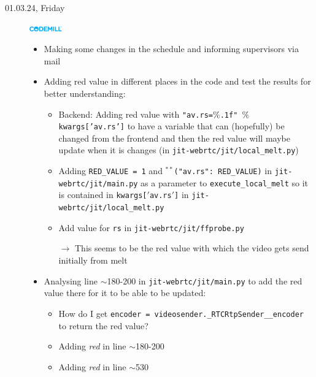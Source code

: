 \documentclass[a4, 11pt]{scrartcl}
\begin{document}
\begin{description}
\item[01.03.24, Friday]
\includegraphics[width=1.4cm]{codemill.png}
\begin{itemize}
	\item Making some changes in the schedule and informing supervisors via mail
	\item Adding red value in different places in the code and test the results for better understanding:
	\begin{itemize}
		\item Backend: Adding red value with \texttt{"av.rs=$\%$.1f" $\%$ kwargs['av.rs']} to have a variable that can (hopefully) be changed from the frontend and then the red value will maybe update when it is changes (in \texttt{jit-webrtc/jit/local\_melt.py})
		\item Adding \texttt{RED\_VALUE = 1} and \texttt{$^{**}$({"av.rs": RED\_VALUE})} in \texttt{jit-webrtc/jit/main.py} as a parameter to \texttt{execute\_local\_melt} so it is contained in \texttt{kwargs[$'$av.rs$'$]} in \texttt{jit-webrtc/jit/local\_melt.py}
		\item Add value for \texttt{rs} in \texttt{jit-webrtc/jit/ffprobe.py}
		\item[$\rightarrow$] This seems to be the red value with which the video gets send initially from melt 
	\end{itemize}
	\item Analysing line $\sim$180-200 in \texttt{jit-webrtc/jit/main.py} to add the red value there for it to be able to be updated:
	\begin{itemize}
		\item How do I get \texttt{encoder = videosender.\_RTCRtpSender\_\_encoder} to return the red value? 
		\item Adding \textit{red} in line $\sim$180-200
		\item Adding \textit{red} in line $\sim$530
    \end{itemize}
\end{itemize}

\end{description}	
\end{document}
